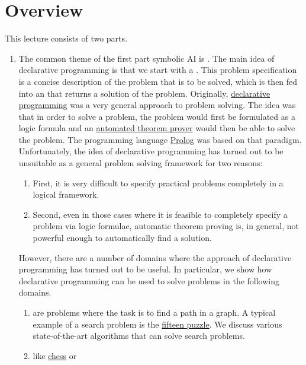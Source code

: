 \section{Overview}
This lecture consists of two parts.
\begin{enumerate}
\item The common theme of the first part symbolic AI is .  
      The main idea of declarative programming is that we start with a .
      This problem specification is a concise description of the problem that is to be solved, which is
      then fed into an  that returns a solution of the problem.  Originally, 
      \href{https://en.wikipedia.org/wiki/Declarative_programming}{declarative programming} was a very general
      approach to problem solving.  The idea was that in order to solve a problem, the problem would first be
      formulated as a logic formula and an
      \href{https://en.wikipedia.org/wiki/Automated_theorem_proving}{automated theorem prover} would then be
      able to solve the problem.  The programming language \href{https://en.wikipedia.org/wiki/Prolog}{Prolog}
      was based on that paradigm.  Unfortunately, the idea of declarative programming has
      turned out to be unsuitable as a general problem solving framework for two reasons:
      \begin{enumerate}
      \item First, it is very difficult to specify practical problems completely in a logical framework.
      \item Second, even in those cases where it is feasible to completely specify a problem via logic formulae,
            automatic theorem proving is, in general, not powerful enough to automatically find a solution. 
      \end{enumerate}
      However, there are a number of domains where the approach of declarative programming has turned out to be
      useful.  In particular, we show how declarative programming can be used to solve problems in the
      following domains.
      \begin{enumerate}
      \item {} are problems where the task is to find a path in a graph.  A typical example of a
            search problem is the \href{https://en.wikipedia.org/wiki/15_puzzle}{fifteen puzzle}.
            We discuss various state-of-the-art algorithms that can solve search problems.
      \item {} like \href{https://en.wikipedia.org/wiki/Chess}{chess} or

\end{enumerate}
\end{enumerate}
